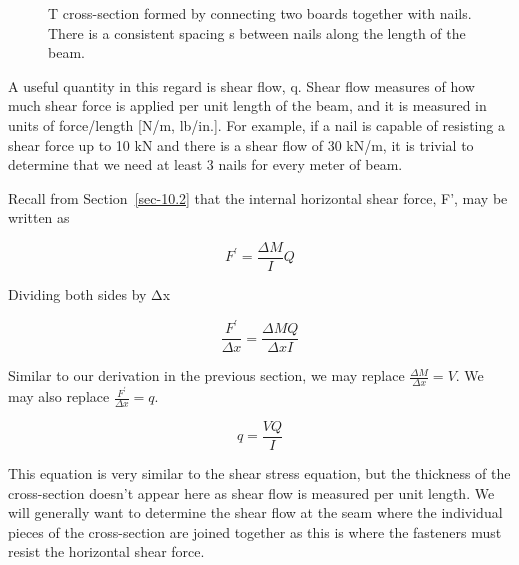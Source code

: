 \documentclass[
  letterpaper,
  DIV=11,
  numbers=noendperiod]{scrreprt}
\theoremstyle{definition}
\theoremstyle{remark}
\begin{document}
\begin{figure}


\caption{\label{fig-10.11}T cross-section formed by connecting two
boards together with nails. There is a consistent spacing s between
nails along the length of the beam.}

\end{figure}%

A useful quantity in this regard is shear flow, q. Shear flow measures
of how much shear force is applied per unit length of the beam, and it
is measured in units of force/length {[}N/m, lb/in.{]}. For example, if
a nail is capable of resisting a shear force up to 10 kN and there is a
shear flow of 30 kN/m, it is trivial to determine that we need at least
3 nails for every meter of beam.

Recall from Section~\ref{sec-10.2} that the internal horizontal shear
force, F', may be written as

\[
F^{\prime}=\frac{\Delta M}{I} Q
\]

Dividing both sides by Δx

\[
\frac{F^{\prime}}{\Delta x}=\frac{\Delta M Q}{\Delta x I}
\]

Similar to our derivation in the previous section, we may replace
\(\frac{\Delta M}{\Delta x}=V\). We may also replace
\(\frac{F^{\prime}}{\Delta x}=q\).

\[
q=\frac{V Q}{I}
\]

This equation is very similar to the shear stress equation, but the
thickness of the cross-section doesn't appear here as shear flow is
measured per unit length. We will generally want to determine the shear
flow at the seam where the individual pieces of the cross-section are
joined together as this is where the fasteners must resist the
horizontal shear force.
\end{document}
